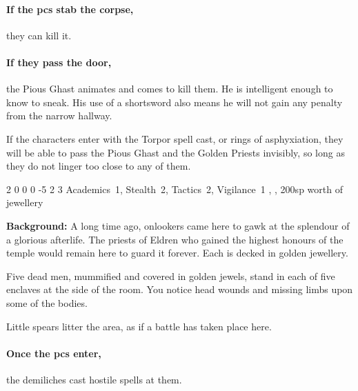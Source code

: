 \paragraph{If the \glspl{pc} stab the corpse,}
they can kill it.

\paragraph{If they pass the door,}
the Pious Ghast animates and comes to kill them.
He is intelligent enough to know to sneak.
His use of a shortsword also means he will not gain any penalty from the narrow hallway.

If the characters enter with the Torpor spell cast, or rings of asphyxiation, they will be able to pass the Pious Ghast and the Golden Priests invisibly, so long as they do not linger too close to any of them.


  {2}%
  {0}%
  {{0}%
  {0}%
  {-5}}%
  {2}%
  {3}%
  {Academics~1, Stealth~2, Tactics~2, Vigilance~1}%
  {\shortsword, \completeplate, 200sp worth of jewellery}%
  {}


\textbf{Background:}
A long time ago, onlookers came here to gawk at the splendour of a glorious afterlife.
The priests of Eldren who gained the highest honours of the temple would remain here to guard it forever.
Each is decked in golden jewellery.

\begin{boxtext}

  Five dead men, mummified and covered in golden jewels, stand in each of five enclaves at the side of the room.
  You notice head wounds and missing limbs upon some of the bodies.

  Little spears litter the area, as if a battle has taken place here.

\end{boxtext}



\paragraph{Once the \glspl{pc} enter,}
the demiliches cast hostile spells at them.

